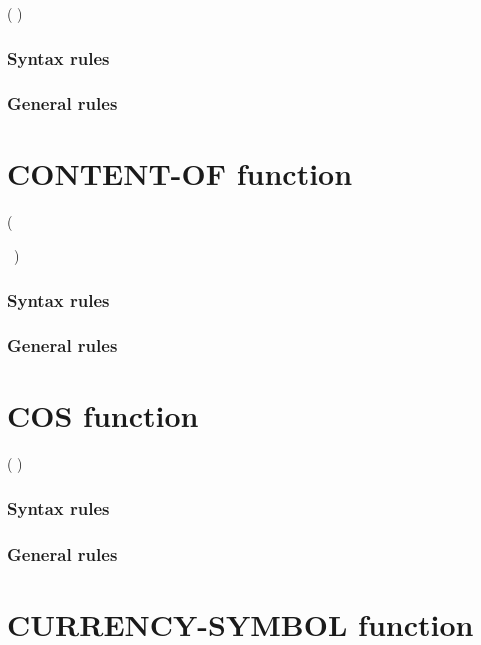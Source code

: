 \begin{syntax}[\gnucobolcolour]
    ( \argument )
\end{syntax}

\subsubsection{Syntax rules}

\subsubsection{General rules}

\section{CONTENT-OF function}

\begin{syntax}[\gnucobolcolour]
    ( \argument
  \begin{0-1}
    \argument
  \end{0-1}
  \ {})
\end{syntax}

\subsubsection{Syntax rules}

\subsubsection{General rules}

\section{COS function}

\begin{syntax}
    ( \argument )
\end{syntax}

\subsubsection{Syntax rules}

\subsubsection{General rules}

\section{CURRENCY-SYMBOL function}

